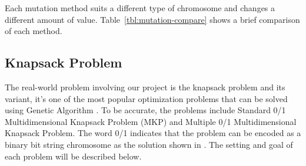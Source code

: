 \documentclass[12pt,oneside,openright,a4paper]{cpe-english-project}
\begin{document}
\begin{itemize}
\begin{enumerate}
		Each mutation method suits a different type of chromosome and changes a different amount of value. Table~\ref{tbl:mutation-compare} shows a brief comparison of each method.

	\end{enumerate}
\end{itemize}

\subsection{Knapsack Problem}
The real-world problem involving our project is the knapsack problem and its variant, it's one of the most popular optimization problems that can be solved using Genetic Algorithm \cite{laabadi20180}. To be accurate, the problems include Standard 0/1 Multidimensional Knapsack Problem (MKP) and Multiple 0/1 Multidimensional Knapsack Problem. The word 0/1 indicates that the problem can be encoded as a binary bit string chromosome as the solution shown in \cite{arpit2022}. The setting and goal of each problem will be described below.
\end{document}
